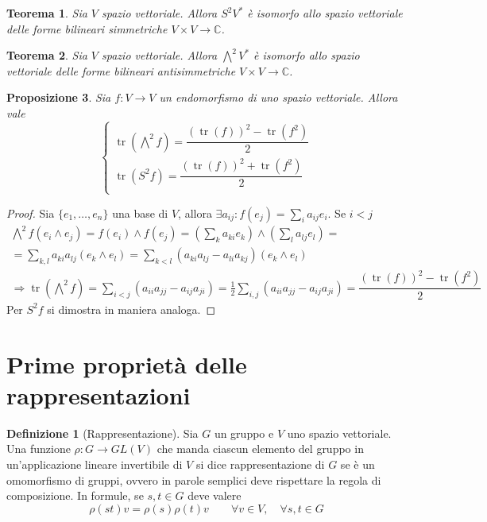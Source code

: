 \documentclass[11pt]{article}
\theoremstyle{plain}
\newtheorem{thm}{Teorema}[section]
\newtheorem{prop}[thm]{Proposizione}
\theoremstyle{definition}
\newtheorem{defn}{Definizione}[section]
\theoremstyle{remark}
\newcommand{\C}{\mathbb{C}}
\DeclareMathOperator{\tr}{tr}
\begin{document}
\begin{thm}
Sia $V$ spazio vettoriale. Allora $S^2V^*$ è isomorfo allo spazio vettoriale delle forme bilineari simmetriche $V\times V\to \C$.
\end{thm}
\begin{thm}
Sia $V$ spazio vettoriale. Allora $\bigwedge^2V^*$ è isomorfo allo spazio vettoriale delle forme bilineari antisimmetriche $V\times V\to \C$.
\end{thm}


\begin{prop}
Sia $f: V \to V$ un endomorfismo di uno spazio vettoriale. Allora vale
\[
\begin{cases}
\tr(\bigwedge^2 f ) = \dfrac{(\tr(f))^2 - \tr(f^2)}{2} \\
\tr(S^2 f ) = \dfrac{(\tr(f))^2 + \tr(f^2)}{2} \\
\end{cases}
\]
\label{thm:tracciasymalt}
\end{prop}


\begin{proof} Sia $\{e_1,\ldots,e_n\}$ una base di $V$, allora $\exists a_{ij}: f(e_j)=\sum_i a_{ij}e_i$. Se $i<j$
\begin{gather*}
\bigwedge^2f(e_i\wedge e_j)=f(e_i)\wedge f(e_j)=\left(\sum_k a_{ki}e_k\right)\wedge\left(\sum_l a_{lj}e_l\right)=\\
=\sum_{k,l}a_{ki}a_{lj}(e_k\wedge e_l)=\sum_{k<l}(a_{ki}a_{lj}-a_{li}a_{kj})(e_k\wedge e_l)\\
\Rightarrow \tr(\bigwedge^2f)=\sum_{i<j}(a_{ii}a_{jj}-a_{ij}a_{ji})=\frac{1}{2}\sum_{i,j}(a_{ii}a_{jj}-a_{ij}a_{ji})= \dfrac{(\tr(f))^2 - \tr(f^2)}{2}
\end{gather*}
Per $S^2f$ si dimostra in maniera analoga.

\end{proof}













\newpage
\section{Prime proprietà delle rappresentazioni}

\begin{defn}[Rappresentazione]
	Sia $G$ un gruppo e $V$ uno spazio vettoriale. Una funzione $\rho: G \to GL(V)$ che manda ciascun elemento del gruppo in un'applicazione lineare invertibile di $V$
	si dice rappresentazione di $G$ se è un omomorfismo di gruppi, ovvero in parole semplici deve rispettare la regola di composizione. In formule, se $s, t \in G$ deve valere
	\[ \rho(st) v = \rho(s)\rho(t) v \qquad \forall v \in V, \quad \forall s,t \in G\]
\end{defn}
\end{document}
